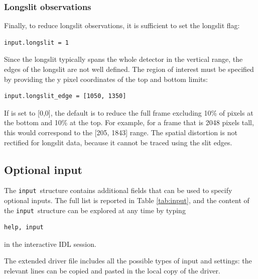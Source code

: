 \documentclass[a4paper]{article}
\newcommand{\inp}{\texttt{input}}
\begin{document}
\begin{sloppypar}
\subsubsection{Longslit observations}
Finally, to reduce longslit observations, it is sufficient to set the longslit flag:
\begin{lstlisting}
input.longslit = 1
\end{lstlisting}
Since the longslit typically spans the whole detector in the vertical range, the edges of the longslit are not well defined. The region of interest must be specified by providing the y pixel coordinates of the top and bottom limits:
\begin{lstlisting}
input.longslit_edge = [1050, 1350]
\end{lstlisting}
If  is set to [0,0], the default is to reduce the full frame excluding 10\% of pixels at the bottom and 10\% at the top. For example, for a frame that is 2048 pixels tall, this would correspond to the [205, 1843] range. The spatial distortion is not rectified for longslit data, because it cannot be traced using the slit edges.


\subsection{Optional input}

The \inp\ structure contains additional fields that can be used to specify optional inputs. The full list is reported in Table \ref{tab:input}, and the content of the \inp\ structure can be explored at any time by typing
\begin{lstlisting}
help, input
\end{lstlisting}
in the interactive IDL session.

The extended driver file  includes all the possible types of input and settings: the relevant lines can be copied and pasted in the local copy of the driver.


\end{sloppypar}
\end{document}
